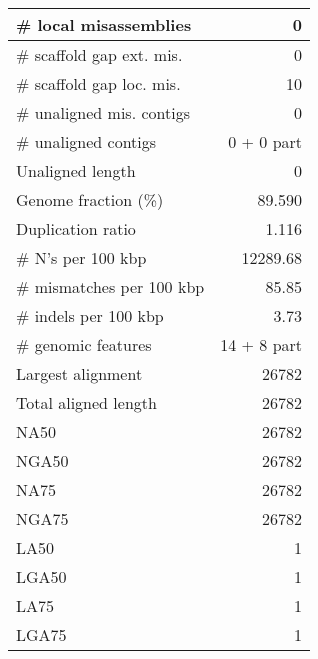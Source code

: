 \documentclass[12pt,a4paper]{article}
\begin{document}
\begin{table}[ht]
\begin{center}
\begin{tabular}{|l*{1}{|r}|}
\# local misassemblies & 0 \\ \hline
\# scaffold gap ext. mis. & 0 \\ \hline
\# scaffold gap loc. mis. & 10 \\ \hline
\# unaligned mis. contigs & 0 \\ \hline
\# unaligned contigs & 0 + 0 part \\ \hline
Unaligned length & 0 \\ \hline
Genome fraction (\%) & 89.590 \\ \hline
Duplication ratio & 1.116 \\ \hline
\# N's per 100 kbp & 12289.68 \\ \hline
\# mismatches per 100 kbp & 85.85 \\ \hline
\# indels per 100 kbp & 3.73 \\ \hline
\# genomic features & 14 + 8 part \\ \hline
Largest alignment & 26782 \\ \hline
Total aligned length & 26782 \\ \hline
NA50 & 26782 \\ \hline
NGA50 & 26782 \\ \hline
NA75 & 26782 \\ \hline
NGA75 & 26782 \\ \hline
LA50 & 1 \\ \hline
LGA50 & 1 \\ \hline
LA75 & 1 \\ \hline
LGA75 & 1 \\ \hline
\end{tabular}
\end{center}
\end{table}
\end{document}
